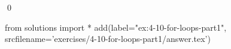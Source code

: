
\begin{ex}
  \label{ex:4-10-for-loops-part1}
  
  \qed
\end{ex}
\begin{python0}
from solutions import *
add(label="ex:4-10-for-loops-part1",
    srcfilename='exercises/4-10-for-loops-part1/answer.tex')
\end{python0}
